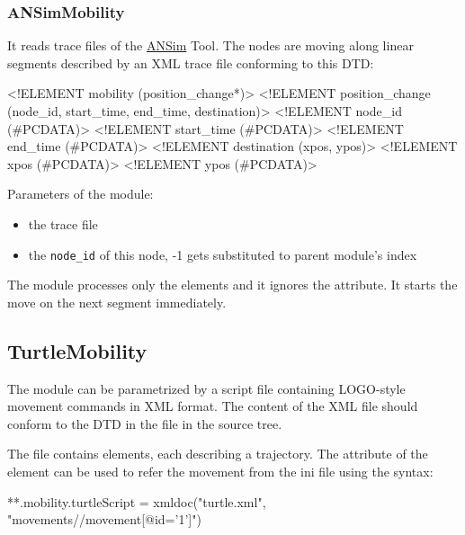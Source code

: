 \subsubsection*{ANSimMobility}

It reads trace files of the \href{http://www.ansim.info}{ANSim} Tool.
The nodes are moving along linear segments described by an XML trace file
conforming to this DTD:

\begin{XML}
<!ELEMENT mobility (position_change*)>
<!ELEMENT position_change (node_id, start_time, end_time, destination)>
<!ELEMENT node_id (#PCDATA)>
<!ELEMENT start_time (#PCDATA)>
<!ELEMENT end_time (#PCDATA)>
<!ELEMENT destination (xpos, ypos)>
<!ELEMENT xpos (#PCDATA)>
<!ELEMENT ypos (#PCDATA)>
\end{XML}

Parameters of the module:

\begin{itemize}
  \item {} the trace file
  \item {} the \verb!node_id! of this node, -1 gets substituted to
  parent module's index
\end{itemize}

\begin{note}
The  module processes only the 
elements and it ignores the  attribute. It starts the move
on the next segment immediately.
\end{note}

\subsection{TurtleMobility}
\label{sec:mobility:turtlemobility}

The  module can be parametrized by a script file
containing LOGO-style movement commands in XML format. The content of
the XML file should conform to the DTD in the 
file in the source tree.

The file contains  elements, each describing a trajectory.
The  attribute of the  element can be used to
refer the movement from the ini file using the syntax:

\begin{inifile}
**.mobility.turtleScript = xmldoc("turtle.xml", "movements//movement[@id='1']")
\end{inifile}


